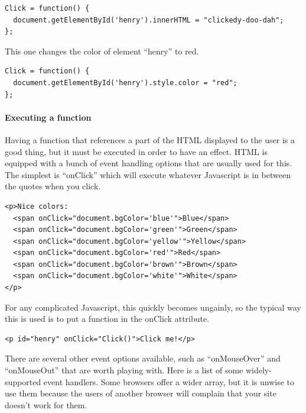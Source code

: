 \documentclass[11pt]{article}
\begin{document}
\begin{verbatim}
Click = function() {
  document.getElementById('henry').innerHTML = "clickedy-doo-dah";
};
\end{verbatim}

This one changes the color of element ``henry'' to red.

\begin{verbatim}
Click = function() {
  document.getElementById('henry').style.color = "red";
};
\end{verbatim}


\paragraph{Executing a function}

Having a function that references a part of the HTML displayed to the
user is a good thing, but it must be executed in order to have an
effect.  HTML is equipped with a bunch of event handling options that
are usually used for this.  The simplest is ``onClick'' which will
execute whatever Javascript is in between the quotes when you click.

\begin{verbatim}
<p>Nice colors:
  <span onClick="document.bgColor='blue'">Blue</span>
  <span onClick="document.bgColor='green'">Green</span>
  <span onClick="document.bgColor='yellow'">Yellow</span>
  <span onClick="document.bgColor='red'">Red</span>
  <span onClick="document.bgColor='brown'">Brown</span>
  <span onClick="document.bgColor='white'">White</span>
</p>
\end{verbatim}

For any complicated Javascript, this quickly becomes ungainly, so the
typical way this is used is to put a function in the onClick attribute.

\begin{verbatim}
<p id="henry" onClick="Click()">Click me!</p>
\end{verbatim}

There are several other event options available, such as ``onMouseOver''
and ``onMouseOut'' that are worth playing with.  Here is a list of some
widely-supported event handlers.  Some browsers offer a wider array,
but it is unwise to use them because the users of another browser will
complain that your site doesn't work for them.
\end{document}
